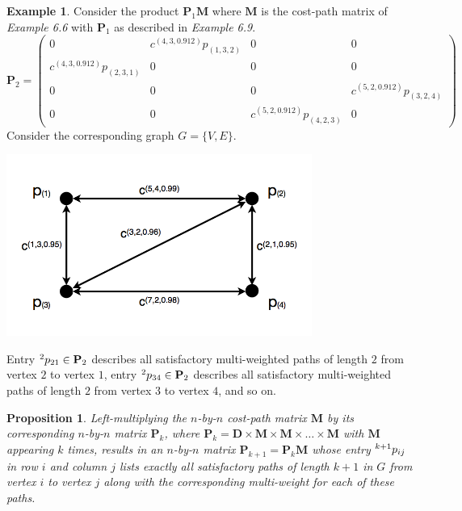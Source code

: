 \documentclass[12pt]{amsart}
\newtheorem{prop}[thm]{Proposition}
\theoremstyle{definition}
\newtheorem{example}[thm]{Example}
\theoremstyle{remark}
\numberwithin{equation}{section}
\begin{document}
\begin{example}
Consider the product $\mathbf{P}_1 \mathbf{M}$ where $\mathbf{M}$ is the cost-path matrix of \textit{Example 6.6} with $\mathbf{P}_1$ as described in \textit{Example 6.9}.
$$
\mathbf{P}_2 = \begin{pmatrix}
0 & c^{(4,3,0.912)} p_{(1,3,2)} & 0 & 0 \\
c^{(4,3,0.912)} p_{(2,3,1)} & 0 & 0 & 0 \\
0 & 0 & 0 & c^{(5,2,0.912)} p_{(3,2,4)} \\
0 & 0 & c^{(5,2,0.912)} p_{(4,2,3)} & 0 \end{pmatrix}
$$
Consider the corresponding graph $G = \{V,E\}$.

\begin{center}\includegraphics[width=10cm]{figure-8-plus.png}\end{center}

\noindent Entry $\prescript{2}{}{p_{21}} \in \mathbf{P}_2$ describes all satisfactory multi-weighted paths of length $2$ from vertex $2$ to vertex $1$, entry $\prescript{2}{}{p_{34}} \in \mathbf{P}_2$ describes all satisfactory multi-weighted paths of length $2$ from vertex $3$ to vertex $4$, and so on.
\end{example}

\newpage

\begin{prop}
Left-multiplying the $n$-by-$n$ cost-path matrix $\mathbf{M}$ by its corresponding $n$-by-$n$ matrix $\mathbf{P}_k$, where $\mathbf{P}_k = \mathbf{D} \times \mathbf{M} \times \mathbf{M} \times \ldots \times \mathbf{M}$ with $\mathbf{M}$ appearing $k$ times, results in an $n$-by-$n$ matrix $\mathbf{P}_{k+1} = \mathbf{P}_k \mathbf{M}$ whose entry $\prescript{k+1}{}{p_{ij}}$ in row $i$ and column $j$ lists exactly all satisfactory paths of length $k+1$ in $G$ from vertex $i$ to vertex $j$ along with the corresponding multi-weight for each of these paths.
\end{prop}
\end{document}
